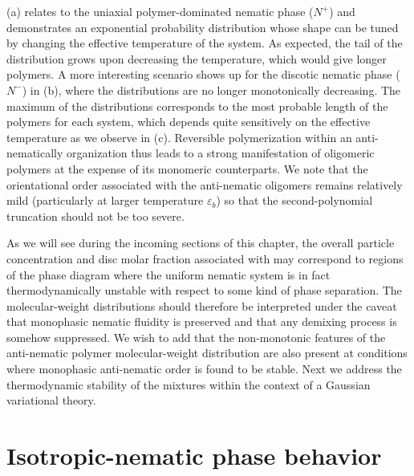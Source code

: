  (a) relates to the uniaxial polymer-dominated nematic phase ($N^+$) and demonstrates an exponential probability distribution  whose shape can be tuned by changing the effective temperature of the system. As expected, the tail of the distribution grows upon decreasing the temperature, which would give longer polymers. A more interesting scenario shows up for the discotic nematic phase ($N^-$) in (b), where the distributions are no longer monotonically decreasing. The maximum of the distributions corresponds to the most probable length of the polymers for each system, which depends quite sensitively on the effective temperature as we  observe in (c). Reversible polymerization within an anti-nematically organization  thus leads to a strong manifestation of oligomeric polymers at the expense of its monomeric counterparts. We  note that the orientational order associated with the anti-nematic oligomers remains relatively mild (particularly at larger temperature $\varepsilon_{b}$) so that the second-polynomial truncation should not be too severe.


As we will see during the incoming sections of this chapter, the overall particle concentration and disc molar fraction  associated with  may correspond to  regions of the phase diagram where the uniform nematic system is in fact thermodynamically unstable with respect to some kind of phase separation. The molecular-weight distributions should therefore be interpreted under the caveat that monophasic nematic fluidity is preserved and that any demixing process is somehow suppressed. We wish to add that the non-monotonic features of the anti-nematic polymer molecular-weight distribution are also present at conditions where monophasic anti-nematic order is found to be stable.  Next we address the  thermodynamic stability of the mixtures  within the context of a Gaussian variational theory. 

\section{Isotropic-nematic phase behavior}

